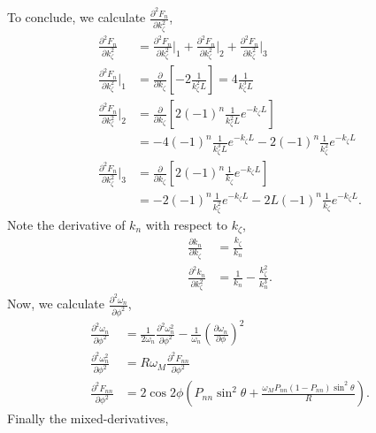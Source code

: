 \documentclass{article}
\begin{document}
To conclude, we calculate $\frac{\partial^2 F_{n}}{\partial k_{\zeta}^2}$,
\begin{align}
\frac{\partial^2 F_{n}}{\partial k_{\zeta}^2} &= \frac{\partial^2 F_{n}}{\partial k_{\zeta}^2}\bigg|_{1} + \frac{\partial^2 F_{n}}{\partial k_{\zeta}^2}\bigg|_{2} + \frac{\partial^2 F_{n}}{\partial k_{\zeta}^2}\bigg|_{3} \\
\frac{\partial^2 F_{n}}{\partial k_{\zeta}^2}\bigg|_{1} &= \frac{\partial}{\partial k_{\zeta}} \left[-2 \frac{1}{k_{\zeta}^2L} \right]= 4 \frac{1}{k_{\zeta}^3 L} \\
\frac{\partial^2 F_{n}}{\partial k_{\zeta}^2}\bigg|_{2} &= \frac{\partial}{\partial k_{\zeta}} \left[ 2 (-1)^n \frac{1}{k_{\zeta}^2 L} e^{-k_{\zeta} L } \right] \\
&= -4 (-1)^n \frac{1}{k_{\zeta}^3 L} e^{-k_{\zeta} L} - 2 (-1)^n \frac{1}{k_{\zeta}^2} e^{- k_{\zeta} L} \\
\frac{\partial^2 F_{n}}{\partial k_{\zeta}^2}\bigg|_{3} &= \frac{\partial}{\partial k_{\zeta}} \left[ 2 (-1)^n \frac{1}{k_{\zeta}} e^{- k_{\zeta} L } \right] \\
&= -2 (-1)^n \frac{1}{k_{\zeta}^2} e^{- k_{\zeta} L } - 2L (-1)^n \frac{1}{k_{\zeta}} e^{- k_{\zeta} L}.
\end{align}
Note the derivative of $k_{n}$ with respect to $k_{\zeta}$,
\begin{align}
\frac{\partial k_{n}}{\partial k_{\zeta}} &= \frac{k_{\zeta}}{k_{n}} \\
\frac{\partial^2 k_{n}}{\partial k_{\zeta}^2} &= \frac{1}{k_{n}} - \frac{k_{\zeta}^2}{k_{n}^3}.
\end{align}
Now, we calculate $\frac{\partial^2 \omega_{n}}{\partial \phi^2}$,
\begin{align}
\frac{\partial^2 \omega_{n}}{\partial \phi^2} &= \frac{1}{2 \omega_{n}} \frac{\partial^2 \omega_{n}^2}{\partial \phi^2} - \frac{1}{\omega_{n}} \left(\frac{\partial \omega_{n}}{\partial \phi}\right)^2 \\
\frac{\partial^2 \omega_{n}^2}{\partial \phi^2} &= R \omega_{M} \frac{\partial^2 F_{nn}}{\partial \phi^2} \\
\frac{\partial^2 F_{nn}}{\partial \phi^2} &= 2 \cos{2\phi} \left( P_{nn} \sin^2{\theta} + \frac{\omega_{M} P_{nn} (1-P_{nn}) \sin^2{\theta}}{R} \right).
\end{align}
Finally the mixed-derivatives,
\end{document}
